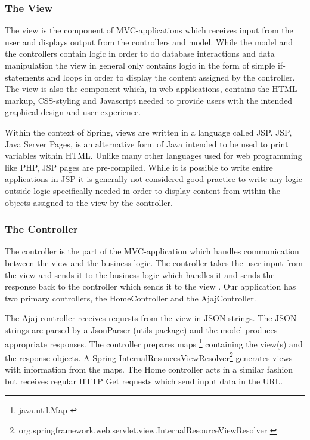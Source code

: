 \subsubsection{The View}
The view is the component of MVC-applications which receives input from the user and displays output from the controllers and model. While the model and the controllers contain logic in order to do database interactions and data manipulation the view in general only contains logic in the form of simple if-statements and loops in order to display the content assigned by the controller. The view is also the component which, in web applications, contains the HTML markup, CSS-styling and Javascript needed to provide users with the intended graphical design and user experience.

Within the context of Spring, views are written in a language called JSP. JSP, Java Server Pages, is an alternative form of Java intended to be used to print variables within HTML. Unlike many other languages used for web programming like PHP, JSP pages are pre-compiled. While it is possible to write entire applications in JSP it is generally not considered good practice to write any logic outside logic specifically needed in order to display content from within the objects assigned to the view by the controller.

\subsubsection{The Controller}
The controller is the part of the MVC-application which handles communication between the view and the business logic. The controller takes the user input from the view and sends it to the business logic which handles it and sends the response back to the controller which sends it to the view \citep{Oracle}. Our application has two primary controllers, the HomeController and the AjajController. 

The Ajaj controller receives requests from the view in JSON strings. The JSON strings are parsed by a JsonParser (utils-package) and the model produces appropriate responses. The controller prepares maps \footnote{java.util.Map \citep{Oraclea}} containing the view(s) and the response objects. A Spring InternalResoucesViewResolver\footnote{org.springframework.web.servlet.view.InternalResourceViewResolver \citep{TheSpring}}  generates views with information  from the maps. The Home controller acts in a similar fashion but receives regular HTTP Get requests which send input data in the URL.


